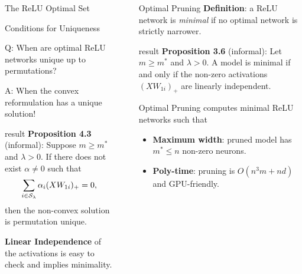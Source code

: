 \documentclass[12pt, usenames, dvipsnames]{beamer}
\newlength{\sepwidth}
\newlength{\colwidth}
\newcommand{\separatorcolumn}{\begin{column}{\sepwidth}\end{column}}
\newcommand{\red}[1]{\textcolor{CBRed}{#1}}
\newcommand{\blue}[1]{\textcolor{CBBlue}{#1}}
\begin{document}
\begin{frame}[t]
\begin{columns}[t]
\begin{column}{\colwidth}
\begin{block}{The ReLU Optimal Set}
			\end{block}
			\vspace{-1em}
			\begin{block}{Conditions for Uniqueness}
				\large

				{ \Large
					\red{Q}: When are optimal ReLU networks unique up to permutations?

					\vspace{0.5em}

					\blue{A}: When the convex reformulation has a unique solution!
				}
				\vspace{0.5em}

				\begin{beamercolorbox}[wd=\textwidth,sep=1em]{result}
					\textbf{Proposition 4.3} (informal):
					Suppose \( m \geq m^* \) and \( \lambda > 0 \).
					If there does not exist \( \alpha \neq 0 \) such that
					\[
						\Large
						\sum_{i\in \mathcal{S}_\lambda } \alpha_i (X W_{1i})_+ = 0,
					\]
					then the non-convex solution is permutation unique.
				\end{beamercolorbox}

				\textbf{Linear Independence} of the activations
				is easy to check and implies \blue{minimality}.

			\end{block}
		\end{column}

		\separatorcolumn

		\begin{column}{\colwidth}
			\vspace{-1.5em}
			\begin{block}{Optimal Pruning}
				\large
				\textbf{Definition}: a ReLU network is \emph{minimal}
				if no optimal network is strictly narrower.

				\vspace{0.5em}

				\begin{beamercolorbox}[wd=\textwidth,sep=1em]{result}
					\textbf{Proposition 3.6} (informal):
					Let
					\( m \geq m^* \) and \( \lambda > 0 \).
					A model is minimal if and only if the non-zero
					activations \( (X W_{1i})_+ \) are linearly independent.
				\end{beamercolorbox}

				\vspace{0.5em}

				

				\blue{Optimal Pruning} computes minimal ReLU networks such that
				\begin{itemize}
					\item \textbf{Maximum width}: pruned model has \( m^* \leq n \) non-zero neurons.
					\item \textbf{Poly-time}: pruning is \( O(n^3 m + n d) \) and GPU-friendly.
				\end{itemize}


\end{block}
\end{column}
\end{columns}
\end{frame}
\end{document}
